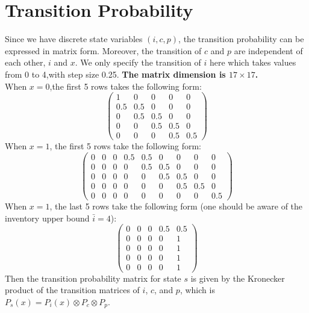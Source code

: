 \documentclass[12pt]{article}[margin=1in]
\begin{document}
\section{Transition Probability}
Since we have discrete state variables $(i,c,p)$, the transition probability
can be expressed in matrix form. Moreover, the transition of $c$ and $p$ are
independent of each other, $i$ and $x$. We only specify the transition of $i$
here which takes values from 0 to 4,with step size 0.25. \textbf{The matrix
    dimension is $17 \times 17$.} \\ When $x = 0$,the first 5 rows takes the
following form:
\begin{equation}\label{eq:trans0}
    \begin{pmatrix}
        1   & 0   & 0   & 0   & 0   \\
        0.5 & 0.5 & 0   & 0   & 0   \\
        0   & 0.5 & 0.5 & 0   & 0   \\
        0   & 0   & 0.5 & 0.5 & 0   \\
        0   & 0   & 0   & 0.5 & 0.5
    \end{pmatrix}
\end{equation}
When $x = 1$, the first 5 rows take the following form:
\begin{equation}\label{eq:trans1}
    \begin{pmatrix}
        0 & 0 & 0 & 0.5 & 0.5 & 0   & 0   & 0   & 0   \\
        0 & 0 & 0 & 0   & 0.5 & 0.5 & 0   & 0   & 0   \\
        0 & 0 & 0 & 0   & 0   & 0.5 & 0.5 & 0   & 0   \\
        0 & 0 & 0 & 0   & 0   & 0   & 0.5 & 0.5 & 0   \\
        0 & 0 & 0 & 0   & 0   & 0   & 0   & 0   & 0.5
    \end{pmatrix}
\end{equation}
When $x = 1$, the last 5 rows take the following form (one should be aware of the inventory upper bound $\bar{i}=4$):
\begin{equation}\label{eq:trans1}
    \begin{pmatrix}
        0 & 0 & 0 & 0.5 & 0.5 \\
        0 & 0 & 0 & 0   & 1   \\
        0 & 0 & 0 & 0   & 1   \\
        0 & 0 & 0 & 0   & 1   \\
        0 & 0 & 0 & 0   & 1
    \end{pmatrix}
\end{equation}
Then the transition probability matrix for state $s$ is given by the Kronecker product of the transition matrices of $i$, $c$, and $p$, which is $P_s(x) = P_i(x) \otimes P_c \otimes P_p$.
\end{document}
